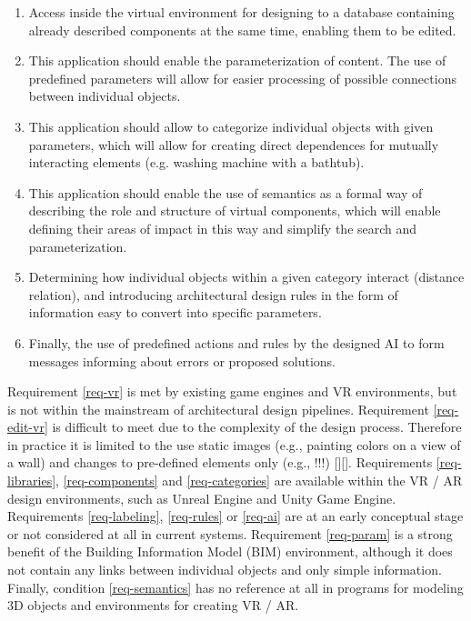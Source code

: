 \documentclass[runningheads]{llncs}
\begin{document}
\begin{enumerate}
\item	\label{req-components} Access inside the virtual environment for designing to a database containing already described components at the same time, enabling them to be edited.\\

\item	\label{req-param} This application should enable the parameterization of content. The use of predefined parameters will allow for easier processing of possible connections between individual objects.\\

\item	\label{req-categories} This application should allow to categorize individual objects with given parameters, which will allow for creating direct dependences for mutually interacting elements (e.g. washing machine with a bathtub).\\

\item	\label{req-semantics} This application should enable the use of semantics as a formal way of describing the role and structure of virtual components, which will enable defining their areas of impact in this way and simplify the search and parameterization.\\

\item	\label{req-rules} Determining how individual objects within a given category interact (distance relation), and introducing architectural design rules in the form of information easy to convert into specific parameters.\\

\item 	\label{req-ai} Finally, the use of predefined actions and rules by the designed AI to form messages informing about errors or proposed solutions.\\
\end{enumerate}

Requirement \ref{req-vr} is met by existing game engines and VR environments, but is not within the mainstream of architectural design pipelines. Requirement \ref{req-edit-vr} is difficult to meet due to the complexity of the design process. Therefore in practice it is limited to the use static images (e.g., painting colors on a view of a wall) and changes to pre-defined elements only (e.g., !!!) [][].
Requirements \ref{req-libraries}, \ref{req-components} and \ref{req-categories} are available within the VR / AR design environments, such as Unreal Engine and Unity  Game Engine. Requirements \ref{req-labeling}, \ref{req-rules} or \ref{req-ai} are at an early conceptual stage or not considered at all in current systems. Requirement \ref{req-param} is a strong benefit of the Building Information Model (BIM) environment, although it does not contain any links between individual objects and only simple information. Finally, condition \ref{req-semantics} has no reference at all in programs for modeling 3D objects and environments for creating VR / AR.
\end{document}
